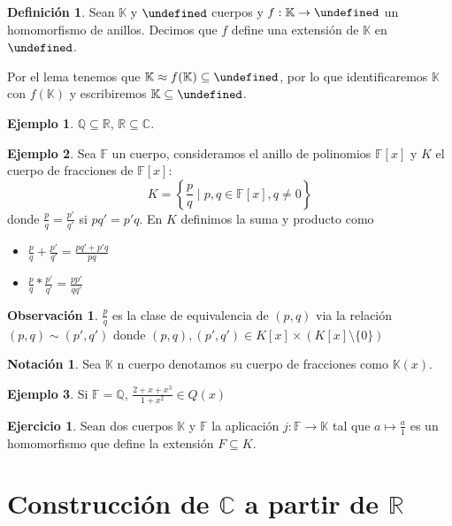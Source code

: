 \documentclass[10pt, spanish]{report}
\theoremstyle{definition}
\newtheorem*{defin}{Definición}
\newtheorem*{notacion}{Notación}
\newtheorem*{ej}{Ejemplo}
\newtheorem*{ejer}{Ejercicio}
\newtheorem*{obs}{Observación}
\newcommand{\Q}{\mathbb{Q}}
\newcommand{\R}{\mathbb{R}}
\newcommand{\C}{\mathbb{C}}
\newcommand{\F}{\mathbb{F}}
\newcommand{\K}{\mathbb{K}}
\let\L\undefined
\newcommand{\L}{\mathbb{L}}
\newcommand{\fecha}[1]{\marginpar{\underline{#1}}}
\begin{document}
\begin{defin}
    Sean $\K$ y $\L$ cuerpos y $f:\K\to\L$ un homomorfismo de anillos. Decimos
    que $f$ define una extensión de $\K$ en $\L$.
\end{defin}

Por el lema tenemos que $\K\approx f(\K)\subseteq \L$, por lo que identificaremos
$\K$ con $f(\K)$ y escribiremos $\K\subseteq \L$.

\begin{ej}
    $\Q\subseteq\R$, $\R\subseteq\C$.
\end{ej}

\fecha{16/02}

\begin{ej}
    Sea $\F$ un cuerpo, consideramos el anillo de polinomios $\F[x]$ y
    $K$ el cuerpo de fracciones de $\F[x]$:
    \[K=\left\{ \frac{p}{q}\mid p,q\in \F[x], q\neq 0 \right\} \]
    donde $\frac{p}{q} = \frac{p'}{q'}$ si $pq'=p'q$.
    En $K$ definimos la suma y producto como

    \begin{itemize}
        \item $\frac{p}{q}+\frac{p'}{q'}=\frac{pq'+p'q}{pq}$
        \item $\frac{p}{q}*\frac{p'}{q'}=\frac{pp'}{qq'}$
    \end{itemize}

\end{ej}

\begin{obs}
    $\frac{p}{q}$ es la clase de equivalencia de $(p,q)$ via la relación
    $(p,q)\sim(p',q')$ donde $(p,q),(p',q')\in K[x]\times(K[x]\setminus\{0\})$
\end{obs}

\begin{notacion}
    Sea $\K$ n cuerpo denotamos su cuerpo de fracciones como $\K(x)$.
\end{notacion}

\begin{ej}
    Si $\F=\Q$, $\frac{2+x+x^3}{1+x^2}\in Q(x)$
\end{ej}

\begin{ejer}
    Sean dos cuerpos $\K$ y $\F$ la aplicación $j:\F\to\K$ tal que $a\mapsto
    \frac{a}{1}$ es un homomorfismo que define la extensión $F\subseteq K$.
\end{ejer}


\section{Construcción de $\C$ a partir de $\R$}
\end{document}
